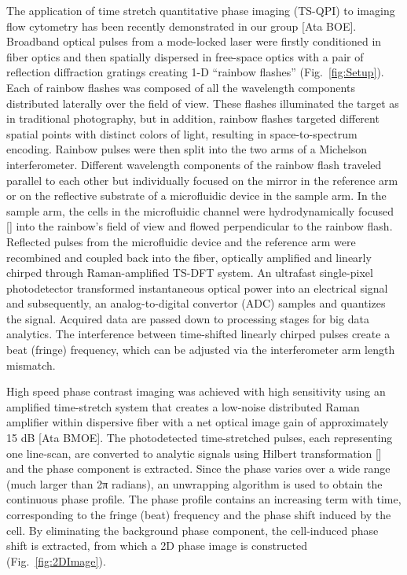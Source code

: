 \documentclass[aps,pra,reprint,superscriptaddress]{revtex4-1}
\begin{document}
The application of time stretch quantitative phase imaging (TS-QPI) to imaging flow cytometry has been recently demonstrated in our group [Ata BOE]. Broadband optical pulses from a mode-locked laser were firstly conditioned in fiber optics and then spatially dispersed in free-space optics with a pair of reflection diffraction gratings creating 1-D “rainbow flashes” (Fig.~\ref{fig:Setup}). Each of rainbow flashes was composed of all the wavelength components distributed laterally over the field of view. These flashes illuminated the target as in traditional photography, but in addition, rainbow flashes targeted different spatial points with distinct colors of light, resulting in space-to-spectrum encoding. Rainbow pulses were then split into the two arms of a Michelson interferometer. Different wavelength components of the rainbow flash traveled parallel to each other but individually focused on the mirror in the reference arm or on the reflective substrate of a microfluidic device in the sample arm. In the sample arm, the cells in the microfluidic channel were hydrodynamically focused [] into the rainbow’s field of view and flowed perpendicular to the rainbow flash. Reflected pulses from the microfluidic device and the reference arm were recombined and coupled back into the fiber, optically amplified and linearly chirped through Raman-amplified TS-DFT system. An ultrafast single-pixel photodetector  transformed instantaneous optical power into an electrical signal and subsequently, an analog-to-digital convertor (ADC) samples and quantizes the signal. Acquired data are passed down to processing stages for big data analytics. The interference between time-shifted linearly chirped pulses create a beat (fringe) frequency, which can be adjusted via the interferometer arm length mismatch.

High speed phase contrast imaging was achieved with high sensitivity using an amplified time-stretch system that creates a low-noise distributed Raman amplifier within dispersive fiber with a net optical image gain of approximately 15 dB [Ata BMOE]. The photodetected time-stretched pulses, each representing one line-scan, are converted to analytic signals using Hilbert transformation [] and the phase component is extracted. Since the phase varies over a wide range (much larger than 2π radians), an unwrapping algorithm is used to obtain the continuous phase profile. The phase profile contains an increasing term with time, corresponding to the fringe (beat) frequency and the phase shift induced by the cell. By eliminating the background phase component, the cell-induced phase shift is extracted, from which a 2D phase image is constructed (Fig.~\ref{fig:2DImage}).
\end{document}
